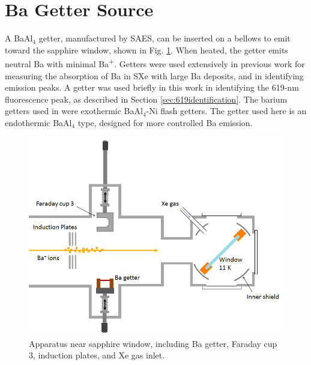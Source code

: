 \section{Ba Getter Source}

A BaAl$_{4}$ getter, manufactured by SAES, can be inserted on a bellows to emit toward the sapphire window, shown in Fig. \ref{fig:endOfBeamBa}.  When heated, the getter emits neutral Ba with minimal Ba\textsuperscript{+}.  Getters were used extensively in previous work \cite{Brian} for measuring the absorption of Ba in SXe with large Ba deposits, and in identifying emission peaks.  A getter was used briefly in this work in identifying the 619-nm fluorescence peak, as described in Section \ref{sec:619identification}.  The barium getters used in \cite{Brian} were exothermic BaAl$_{4}$-Ni flash getters.  The getter used here is an endothermic BaAl$_{4}$ type, designed for more controlled Ba emission.  


\begin{figure} %
        \centering
                \includegraphics[width=.75\textwidth]{figures/window_etc_justBa.png}
                \caption{Apparatus near sapphire window, including Ba getter, Faraday cup 3, induction plates, and Xe gas inlet.}
\label{fig:endOfBeamBa}
\end{figure}


